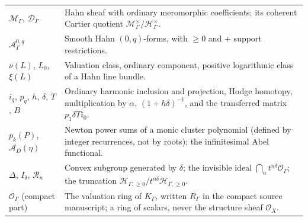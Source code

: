 \documentclass[11pt,letterpaper]{article}
\theoremstyle{definition}
\theoremstyle{remark}
\newcommand{\OO}{\mathcal O}
\newcommand{\HH}{\mathscr H_\Gamma}
\newcommand{\HI}{\mathscr H_{\Gamma,\ge0}}
\newcommand{\KK}{K_\Gamma}
\newcommand{\MG}{\mathscr M_\Gamma}
\newcommand{\DG}{\mathscr D_\Gamma}
\numberwithin{equation}{section}
\begin{document}
\begin{center}
\begin{tabular}{@{}L{0.26\textwidth}L{0.63\textwidth}@{}}
$\MG$, $\DG$ & Hahn sheaf with ordinary meromorphic coefficients; its coherent Cartier quotient $\MG^\times/\HH^\times$.\\[0.3em]
$\mathscr A^{0,q}_\Gamma$ & Smooth Hahn $(0,q)$-forms, with $\ge0$ and $+$ support restrictions.\\[0.3em]
$\nu(L)$, $L_0$, $\xi(L)$ & Valuation class, ordinary component, positive logarithmic class of a Hahn line bundle.\\[0.3em]
$i_q$, $p_q$, $h$, $\delta$, $T$, $B$ & Ordinary harmonic inclusion and projection, Hodge homotopy, multiplication by $\alpha$, $(1+h\delta)^{-1}$, and the transferred matrix $p_1\delta Ti_0$.\\[0.3em]
$p_k(P)$, $\mathcal A_D(\eta)$ & Newton power sums of a monic cluster polynomial (defined by integer recurrences, not by roots); the infinitesimal Abel functional.\\[0.3em]
$\Delta$, $I_\delta$, $\mathscr R_n$ & Convex subgroup generated by $\delta$; the invisible ideal $\bigcap_nt^{n\delta}\OO_\Gamma$; the truncation $\HI/t^{n\delta}\HI$.\\[0.3em]
$\OO_\Gamma$ (compact part) & The valuation ring of $\KK$, written $R_\Gamma$ in the compact source manuscript; a ring of scalars, never the structure sheaf $\OO_X$.\\
\bottomrule
\end{tabular}
\end{center}
\end{document}

